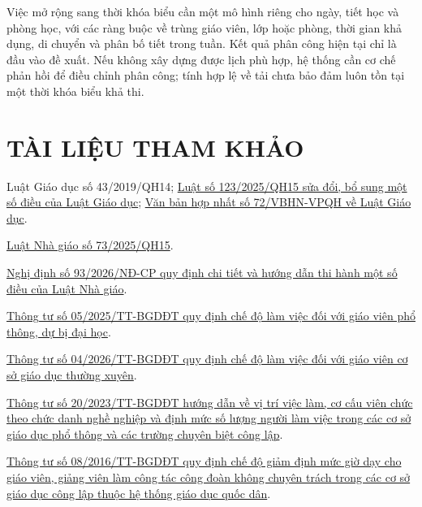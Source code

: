 \documentclass[12pt,a4paper]{report}
\begin{document}
Việc mở rộng sang thời khóa biểu cần một mô hình riêng cho ngày, tiết học và phòng học, với các ràng buộc về trùng giáo viên, lớp hoặc phòng, thời gian khả dụng, di chuyển và phân bố tiết trong tuần. Kết quả phân công hiện tại chỉ là đầu vào đề xuất. Nếu không xây dựng được lịch phù hợp, hệ thống cần cơ chế phản hồi để điều chỉnh phân công; tính hợp lệ về tải chưa bảo đảm luôn tồn tại một thời khóa biểu khả thi.
\chapter*{TÀI LIỆU THAM KHẢO}
\label{chap:references}
\begin{enumerate}[label={[\arabic*]},leftmargin=1.1cm,itemsep=0.6em]
\item\label{ref:source-1} Luật Giáo dục số 43/2019/QH14; \href{https://vanban.chinhphu.vn/?docid=216504\&pageid=27160}{Luật số 123/2025/QH15 sửa đổi, bổ sung một số điều của Luật Giáo dục}; \href{https://vanban.chinhphu.vn/?docid=217346\&pageid=27160}{Văn bản hợp nhất số 72/VBHN-VPQH về Luật Giáo dục}.

\item\label{ref:source-2} \href{https://vanban.chinhphu.vn/?docid=214559\&pageid=27160}{Luật Nhà giáo số 73/2025/QH15}.

\item\label{ref:source-3} \href{https://vanban.chinhphu.vn/?docid=217499\&pageid=27160}{Nghị định số 93/2026/NĐ-CP quy định chi tiết và hướng dẫn thi hành một số điều của Luật Nhà giáo}.

\item\label{ref:source-4} \href{https://vanban.chinhphu.vn/?docid=213113\&pageid=27160}{Thông tư số 05/2025/TT-BGDĐT quy định chế độ làm việc đối với giáo viên phổ thông, dự bị đại học}.

\item\label{ref:source-5} \href{https://vanban.chinhphu.vn/?docid=216931\&pageid=27160}{Thông tư số 04/2026/TT-BGDĐT quy định chế độ làm việc đối với giáo viên cơ sở giáo dục thường xuyên}.

\item\label{ref:source-6} \href{https://vanban.chinhphu.vn/?docid=208996\&pageid=27160}{Thông tư số 20/2023/TT-BGDĐT hướng dẫn về vị trí việc làm, cơ cấu viên chức theo chức danh nghề nghiệp và định mức số lượng người làm việc trong các cơ sở giáo dục phổ thông và các trường chuyên biệt công lập}.

\item\label{ref:source-7} \href{https://vanban.chinhphu.vn/?docid=184806\&pageid=27160}{Thông tư số 08/2016/TT-BGDĐT quy định chế độ giảm định mức giờ dạy cho giáo viên, giảng viên làm công tác công đoàn không chuyên trách trong các cơ sở giáo dục công lập thuộc hệ thống giáo dục quốc dân}.


\end{enumerate}
\end{document}
